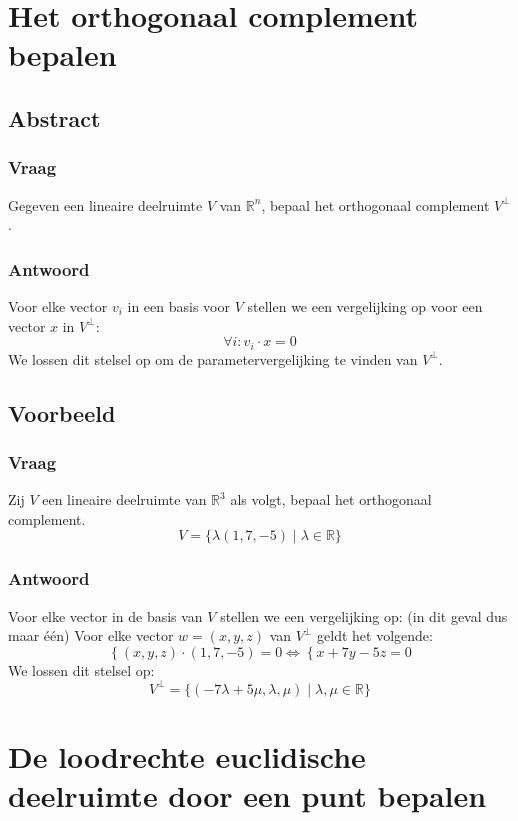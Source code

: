 \documentclass[main.tex]{subfiles}
\begin{document}
\section{Het orthogonaal complement bepalen}
\label{sec:orthogonaal-complement-bepalen}
\subsection{Abstract}
\subsubsection{Vraag}
\begin{center}
  Gegeven een lineaire deelruimte $V$ van $\mathbb{R}^{n}$, bepaal het orthogonaal complement $V^{\bot}$.
\end{center}

\subsubsection{Antwoord}
Voor elke vector $v_{i}$ in een basis voor $V$ stellen we een vergelijking op voor een vector $x$ in $V^{\bot}$:
\[ \forall i: v_{i}\cdot x = 0 \]
We lossen dit stelsel op om de parametervergelijking te vinden van $V^{\bot}$.

\subsection{Voorbeeld}
\subsubsection{Vraag}
\begin{center}
  Zij $V$ een lineaire deelruimte van $\mathbb{R}^{3}$ als volgt, bepaal het orthogonaal complement.
  \[ V = \{ \lambda(1,7,-5) \mid \lambda \in \mathbb{R} \} \]
\end{center}
\subsubsection{Antwoord}
Voor elke vector in de basis van $V$ stellen we een vergelijking op: (in dit geval dus maar \'e\'en)
Voor elke vector $w=(x,y,z)$ van $V^{\bot}$ geldt het volgende:
\[ \left\{ (x,y,z) \cdot (1,7,-5) = 0\right. \Leftrightarrow \left\{ x+7y-5z=0 \right. \]
We lossen dit stelsel op:
\[ V^{\bot} = \{ (-7\lambda+5\mu,\lambda,\mu) \mid \lambda,\mu \in \mathbb{R} \} \]


\newpage
\section{De loodrechte euclidische deelruimte door een punt bepalen}
\end{document}

